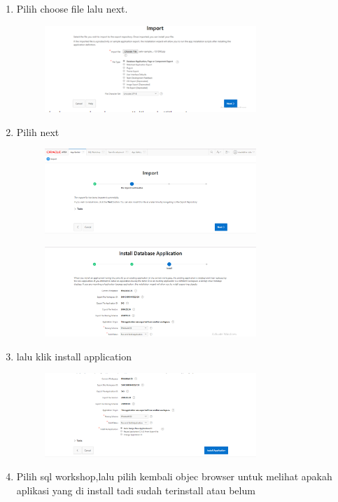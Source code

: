\documentclass{article}
\begin{document}
\begin{enumerate}
\begin{figure}[h]
            \end{figure}
         \item Pilih choose file lalu next.
\begin{figure}[h]
\centerline{\includegraphics[width=8cm]{figure/3.png}}
            \end{figure}  
        \newpage \item Pilih next
\begin{figure}[h]
\centerline{\includegraphics[width=8cm]{figure/4.png}}
            \end{figure}  
            \begin{figure}[h]
\centerline{\includegraphics[width=8cm]{figure/5.png}}
            \end{figure}  
            \item lalu klik install application
\begin{figure}[h]
\centerline{\includegraphics[width=8cm]{figure/6.png}}
            \end{figure}
           \newpage \item Pilih sql workshop,lalu pilih kembali objec browser untuk melihat apakah aplikasi yang di install tadi sudah terinstall atau belum

\end{enumerate}
\end{document}
